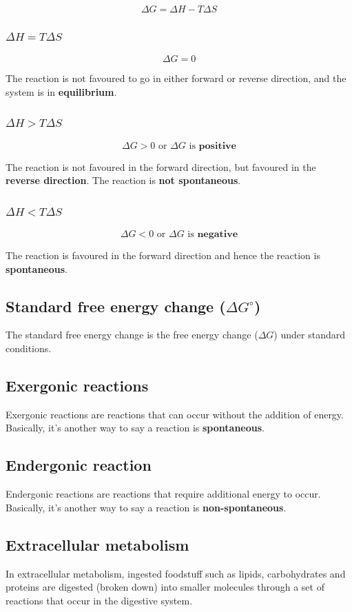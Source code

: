 \documentclass[11pt]{article}
\begin{document}
\[\Delta G = \Delta H - T \Delta S\]
\subsubsection{\(\Delta H = T \Delta S\)}
\label{sec:org8780399}
\[\Delta G = 0\]

The reaction is not favoured to go in either forward or reverse direction, and the system is in \textbf{equilibrium}.
\subsubsection{\(\Delta H > T \Delta S\)}
\label{sec:org7dbb8fd}
\[\Delta G > 0 \text{ or } \Delta G \text{ is } \textbf{positive}\]

The reaction is not favoured in the forward direction, but favoured in the \textbf{reverse direction}. The reaction is \textbf{not spontaneous}.
\subsubsection{\(\Delta H < T \Delta S\)}
\label{sec:org3c43de2}
\[\Delta G < 0 \text{ or } \Delta G \text{ is } \textbf{negative}\]

The reaction is favoured in the forward direction and hence the reaction is \textbf{spontaneous}.
\subsection{Standard free energy change (\(\Delta G^{\circ}\))}
\label{sec:org5623664}
The standard free energy change is the free energy change (\(\Delta G\)) under standard conditions.
\subsection{Exergonic reactions}
\label{sec:orgfe9cfb6}
Exergonic reactions are reactions that can occur without the addition of energy. Basically, it's another way to say a reaction is \textbf{spontaneous}.
\subsection{Endergonic reaction}
\label{sec:org29fe440}
Endergonic reactions are reactions that require additional energy to occur. Basically, it's another way to say a reaction is \textbf{non-spontaneous}.
\subsection{Extracellular metabolism}
\label{sec:orga662e22}
In extracellular metabolism, ingested foodstuff such as lipids, carbohydrates and proteins are digested (broken down) into smaller molecules through a set of reactions that occur in the digestive system.
\end{document}
